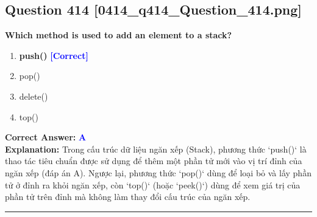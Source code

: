 \documentclass[11pt,a4paper]{article}
\begin{document}
\begin{minipage}{\textwidth}
\subsection*{Question 414 \quad \footnotesize{[0414\_q414\_Question\_414.png]}}
\noindent \textbf{Which method is used to add an element to a stack?}

\begin{enumerate}[label=\Alph*.]
    \item \textbf{push()} \hfill \textcolor{blue}{\textbf{[Correct]}}
    \item pop()
    \item delete()
    \item top()
\end{enumerate}

\noindent \textbf{Correct Answer:} \textcolor{blue}{\textbf{A}} \\[2pt]
\noindent \textbf{Explanation:} Trong cấu trúc dữ liệu ngăn xếp (Stack), phương thức `push()` là thao tác tiêu chuẩn được sử dụng để thêm một phần tử mới vào vị trí đỉnh của ngăn xếp (đáp án A). Ngược lại, phương thức `pop()` dùng để loại bỏ và lấy phần tử ở đỉnh ra khỏi ngăn xếp, còn `top()` (hoặc `peek()`) dùng để xem giá trị của phần tử trên đỉnh mà không làm thay đổi cấu trúc của ngăn xếp.

\par\vspace{0.3cm}
\hrule
\vspace{0.3cm}
\end{minipage}
\end{document}
